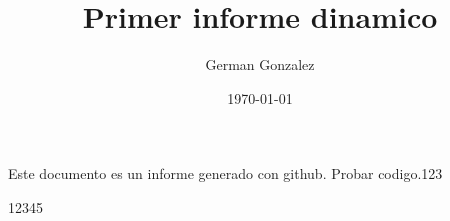 \documentclass[12pt,a4paper]{book}
\title{Primer informe dinamico}
\author{German Gonzalez}
\date{\today}
\begin{document}
\maketitle

Este documento es un informe generado con github.
Probar codigo.123

12345
\end{document}
